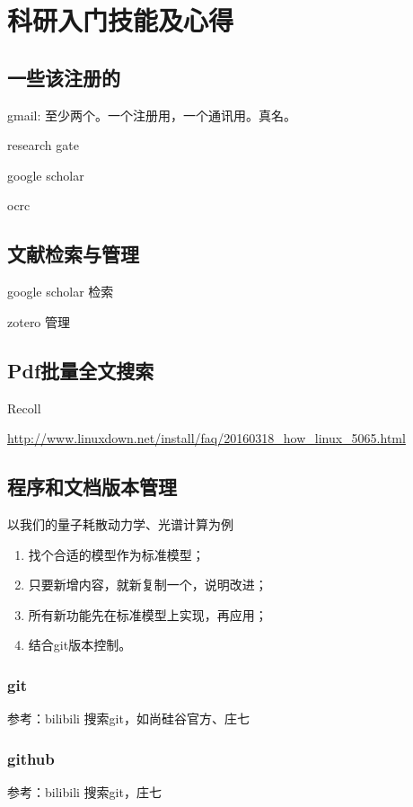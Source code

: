 \documentclass[a4paper,11pt,twoside]{book}
\begin{document}
\chapter{科研入门技能及心得}
\section{一些该注册的}
gmail: 至少两个。一个注册用，一个通讯用。真名。

research gate

google scholar

ocrc

\section{文献检索与管理}
google scholar 检索

zotero 管理

\section{Pdf批量全文搜索}
Recoll

\url{http://www.linuxdown.net/install/faq/20160318_how_linux_5065.html}



\section{程序和文档版本管理}
以我们的量子耗散动力学、光谱计算为例
\begin{enumerate}
\item 找个合适的模型作为标准模型；
\item 只要新增内容，就新复制一个，说明改进；
\item 所有新功能先在标准模型上实现，再应用；
\item 结合git版本控制。
\end{enumerate}



\subsection{git}
参考：bilibili 搜索git，如尚硅谷官方、庄七



\subsection{github}
参考：bilibili 搜索git，庄七
\end{document}
